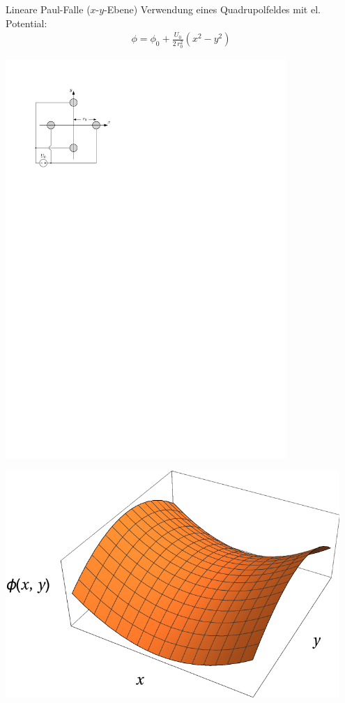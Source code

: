 \documentclass[12pt,xcolor=dvipsnames]{beamer}
\begin{document}
\begin{frame}{Lineare Paul-Falle ($x$-$y$-Ebene)}
	Verwendung eines Quadrupolfeldes mit el. Potential:
	\begin{align}
	\phi = \phi_0 + \frac{U_0}{2 \, r_0^2} (x^2-y^2)
	\end{align}
	\begin{minipage}[c]{0.5\textwidth}
		\centering
		\includegraphics[width=0.8\textwidth]{./figures/lineare_paulfalle_xy_statisch.pdf}
	\end{minipage}%
	\begin{minipage}[c]{0.5\textwidth}
		\centering
		\includegraphics[width=0.95\textwidth]{./figures/sattelpotential.pdf}
	\end{minipage}
\end{frame}
\end{document}
